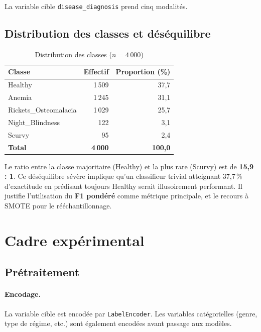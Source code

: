 \documentclass[12pt,a4paper]{article}
\begin{document}
La variable cible \texttt{disease\_diagnosis} prend cinq modalités.

\subsection{Distribution des classes et déséquilibre}

\begin{table}[H]
\centering
\caption{Distribution des classes ($n = 4\,000$)}
\label{tab:classes}
\begin{tabular}{lrr}
\toprule
\textbf{Classe} & \textbf{Effectif} & \textbf{Proportion (\%)} \\
\midrule
Healthy               & 1\,509 & 37,7 \\
Anemia                & 1\,245 & 31,1 \\
Rickets\_Osteomalacia & 1\,029 & 25,7 \\
Night\_Blindness      &    122 &  3,1 \\
Scurvy                &     95 &  2,4 \\
\midrule
\textbf{Total}        & \textbf{4\,000} & \textbf{100,0} \\
\bottomrule
\end{tabular}
\end{table}

Le ratio entre la classe majoritaire (Healthy) et la plus rare (Scurvy) est de
\textbf{15,9 : 1}. Ce déséquilibre sévère implique qu'un classifieur trivial
atteignant 37,7\,\% d'exactitude en prédisant toujours \og Healthy \fg serait
illusoirement performant. Il justifie l'utilisation du \textbf{F1 pondéré}
comme métrique principale, et le recours à SMOTE pour le rééchantillonnage.

\section{Cadre expérimental}

\subsection{Prétraitement}

\paragraph{Encodage.}
La variable cible est encodée par \texttt{LabelEncoder}.
Les variables catégorielles (genre, type de régime, etc.) sont également encodées
avant passage aux modèles.
\end{document}
